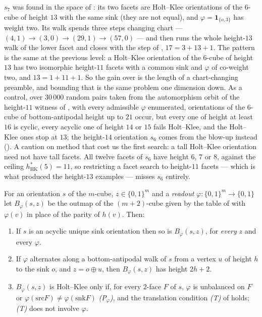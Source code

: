 \begin{remark}\label{hkd:found}
$s_7$ was found in the space of : its two facets are
Holt--Klee orientations of the $6$-cube of height $13$ with the same sink
(they are not equal), and $\varphi=\mathbf 1_{\{o,3\}}$ has weight two. Its walk
spends three steps changing chart --- $(4,1)\to(3,0)\to(29,1)\to(57,0)$
--- and then runs the whole height-$13$ walk of the lower facet and closes
with the step of , $17=3+13+1$. The pattern is the
same at the previous level: a Holt--Klee orientation of the $6$-cube of
height $13$ has two isomorphic height-$11$ facets with a common sink and
$\varphi$ of co-weight two, and $13=1+11+1$. So the gain over
 is the length of a chart-changing preamble, and
bounding that is the same problem one dimension down. As a control, over
$30\,000$ random pairs taken from the automorphism orbit of the height-$11$
witness of , with every admissible $\varphi$
enumerated, orientations of the $6$-cube of bottom-antipodal height up to
$21$ occur, but every one of height at least $16$ is cyclic, every acyclic
one of height $14$ or $15$ fails Holt--Klee, and the Holt--Klee ones stop
at $13$; the height-$14$ orientation $s_6$ comes from the blow-up instead
(). A caution on method that cost us the first
search: a tall Holt--Klee orientation need not have tall facets. All
twelve facets of $s_6$ have height $6$, $7$ or $8$, against the ceiling
$h^{\ast}_{\mathrm{HK}}(5)=11$, so restricting a facet search to
height-$11$ facets --- which is what produced the height-$13$ examples ---
misses $s_6$ entirely.
\end{remark}

\begin{proposition}\label{hkd:readout}
For an orientation $s$ of the $m$-cube, $z\in\{0,1\}^{m}$ and a
\emph{readout} $\varphi:\{0,1\}^{m}\to\{0,1\}$ let $B_\varphi(s,z)$ be the
outmap of the $(m+2)$-cube given by the table of  with
$\varphi(v)$ in place of the parity of $h(v)$. Then:
\begin{enumerate}
\item[(a)] If $s$ is an acyclic unique sink orientation then so is
$B_\varphi(s,z)$, for \emph{every} $z$ and every $\varphi$.
\item[(b)] If $\varphi$ alternates along a bottom-antipodal walk of $s$
from a vertex $u$ of height $h$ to the sink $o$, and $z=o\oplus u$, then
$B_\varphi(s,z)$ has height $2h+2$.
\item[(c)] $B_\varphi(s,z)$ is Holt--Klee only if, for every $2$-face $F$
of $s$, $\varphi$ is unbalanced on $F$ or $\varphi(\mathrm{src}F)\ne
\varphi(\mathrm{snk}F)$ \emph{(P$_\varphi$)}, and the translation
condition \emph{(T)} of  holds; \emph{(T)} does not
involve $\varphi$.
\end{enumerate}
\end{proposition}

